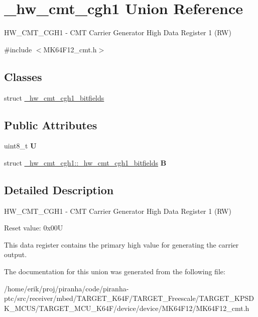 \hypertarget{union__hw__cmt__cgh1}{}\section{\+\_\+hw\+\_\+cmt\+\_\+cgh1 Union Reference}
\label{union__hw__cmt__cgh1}


H\+W\+\_\+\+C\+M\+T\+\_\+\+C\+G\+H1 -\/ C\+MT Carrier Generator High Data Register 1 (RW)  




{\ttfamily \#include $<$M\+K64\+F12\+\_\+cmt.\+h$>$}

\subsection*{Classes}
\begin{DoxyCompactItemize}
\item 
struct \hyperlink{struct__hw__cmt__cgh1_1_1__hw__cmt__cgh1__bitfields}{\+\_\+hw\+\_\+cmt\+\_\+cgh1\+\_\+bitfields}
\end{DoxyCompactItemize}
\subsection*{Public Attributes}
\begin{DoxyCompactItemize}
\item 
uint8\+\_\+t {\bfseries U}\hypertarget{union__hw__cmt__cgh1_a205419f229215f52f1f8922f677669a1}{}\label{union__hw__cmt__cgh1_a205419f229215f52f1f8922f677669a1}

\item 
struct \hyperlink{struct__hw__cmt__cgh1_1_1__hw__cmt__cgh1__bitfields}{\+\_\+hw\+\_\+cmt\+\_\+cgh1\+::\+\_\+hw\+\_\+cmt\+\_\+cgh1\+\_\+bitfields} {\bfseries B}\hypertarget{union__hw__cmt__cgh1_a844064c19b8bee29d794822130f4f41d}{}\label{union__hw__cmt__cgh1_a844064c19b8bee29d794822130f4f41d}

\end{DoxyCompactItemize}


\subsection{Detailed Description}
H\+W\+\_\+\+C\+M\+T\+\_\+\+C\+G\+H1 -\/ C\+MT Carrier Generator High Data Register 1 (RW) 

Reset value\+: 0x00U

This data register contains the primary high value for generating the carrier output. 

The documentation for this union was generated from the following file\+:\begin{DoxyCompactItemize}
\item 
/home/erik/proj/piranha/code/piranha-\/ptc/src/receiver/mbed/\+T\+A\+R\+G\+E\+T\+\_\+\+K64\+F/\+T\+A\+R\+G\+E\+T\+\_\+\+Freescale/\+T\+A\+R\+G\+E\+T\+\_\+\+K\+P\+S\+D\+K\+\_\+\+M\+C\+U\+S/\+T\+A\+R\+G\+E\+T\+\_\+\+M\+C\+U\+\_\+\+K64\+F/device/device/\+M\+K64\+F12/M\+K64\+F12\+\_\+cmt.\+h\end{DoxyCompactItemize}
